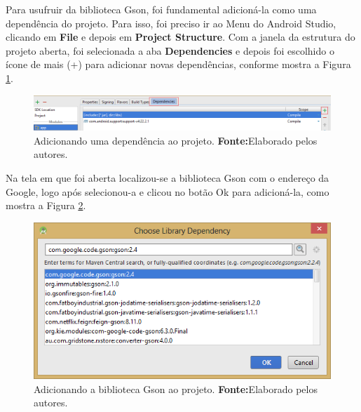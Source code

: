 	\par Para usufruir da biblioteca Gson, foi fundamental adicioná-la como uma
dependência do projeto. Para isso, foi preciso ir ao Menu do Android Studio,
clicando em \textbf{File} e depois em \textbf{Project Structure}. Com a janela
da estrutura do projeto aberta, foi selecionada a aba \textbf{Dependencies} e
depois foi escolhido o ícone de mais (+) para adicionar novas dependências,
conforme mostra a Figura \ref{fig:app6}.
	
	\begin{landscape}
	
		\begin{figure}[h!] 
			\centerline{\includegraphics[scale=0.7]{./imagens/2_q_metodologico/4_procedimentos_resultados/42_aplicativo/app6.png}}
			\caption[Adicionando uma dependência ao projeto]{Adicionando uma dependência ao projeto.
			\textbf{Fonte:}Elaborado pelos autores.}
			\label{fig:app6}
		\end{figure}
	
	\pagebreak
	
	\end{landscape}
	
	\par Na tela em que foi aberta localizou-se a biblioteca Gson com o endereço da
Google, logo após selecionou-a e clicou no botão Ok para adicioná-la, como
mostra a Figura \ref{fig:app7}.
	
		\begin{figure}[h!] 
			\centerline{\includegraphics[scale=0.7]{./imagens/2_q_metodologico/4_procedimentos_resultados/42_aplicativo/app7.png}}
			\caption[Adicionando a biblioteca Gson ao projeto]{Adicionando a biblioteca Gson ao projeto.
			\textbf{Fonte:}Elaborado pelos autores.}
			\label{fig:app7}
		\end{figure}
	
	\pagebreak
